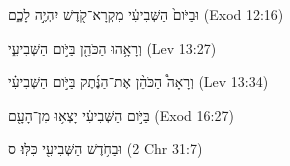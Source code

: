 
\begin{exe}

\ex\label{ex_ordn_time1}
\texthebrew{
וּבַיֹּום֙ הַשְּׁבִיעִ֔י מִקְרָא־קֹ֖דֶשׁ יִהְיֶ֣ה לָכֶ֑ם 
} (Exod 12:16)

\ex\label{ex_ordn_time2}
\texthebrew{
וְרָאָ֥הוּ הַכֹּהֵ֖ן בַּיֹּ֣ום הַשְּׁבִיעִ֑י 
} (Lev 13:27)

\ex\label{ex_ordn_time3}
\texthebrew{
וְרָאָה֩ הַכֹּהֵ֨ן אֶת־הַנֶּ֜תֶק בַּיֹּ֣ום הַשְּׁבִיעִ֗י 
} (Lev 13:34)

\ex\label{ex_ordn_time4}
\texthebrew{
בַּיֹּ֣ום הַשְּׁבִיעִ֔י יָצְא֥וּ מִן־הָעָ֖ם 
} (Exod 16:27)

\ex\label{ex_ordn_time5}
\texthebrew{
וּבַחֹ֥דֶשׁ הַשְּׁבִיעִ֖י כִּלּֽוּ׃ ס 
} (2 Chr 31:7)

\end{exe}
